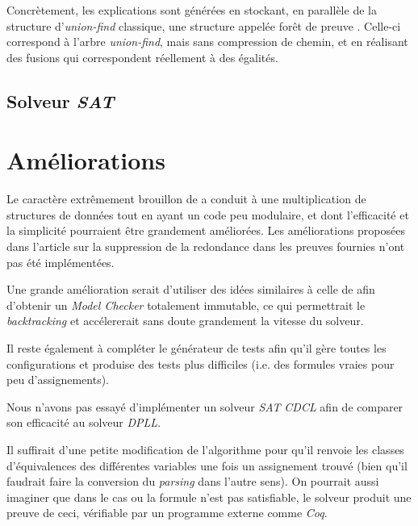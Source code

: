 \documentclass[a4paper, 10pt, french]{article}
\newcommand{\foreign}[1]{\emph{#1}}
\begin{document}
Concrètement, les explications sont générées en stockant, en parallèle de la 
structure d'\foreign{union-find} classique, une structure appelée \og forêt de 
preuve \fg. Celle-ci correspond à l'arbre \foreign{union-find}, mais sans 
compression de chemin, et en réalisant des fusions qui correspondent réellement 
à des égalités.


\subsection {Solveur \foreign{SAT}}


\section{Améliorations}

Le caractère extrêmement brouillon de \cite{ExplainUF} a conduit à une 
multiplication de structures de données tout en ayant un code peu modulaire, et 
dont l'efficacité et la simplicité pourraient être grandement améliorées. Les 
améliorations proposées dans l'article sur la suppression de la redondance dans 
les preuves fournies n'ont pas été implémentées.

Une grande amélioration serait d'utiliser des idées similaires à celle de 
\cite{PersistentUF} afin d'obtenir un \foreign{Model Checker} totalement 
immutable, ce qui permettrait le \foreign{backtracking} et accélererait sans 
doute grandement la vitesse du solveur.

Il reste également à compléter le générateur de tests afin qu'il gère toutes 
les configurations et produise des tests plus difficiles (i.e. des formules 
vraies pour peu d'assignements).

Nous n'avons pas essayé d'implémenter un solveur \foreign{SAT} \foreign{CDCL} 
afin de comparer son efficacité au solveur \foreign{DPLL}.

Il suffirait d'une petite modification de l'algorithme pour qu'il renvoie les 
classes d'équivalences des différentes variables une fois un assignement trouvé 
(bien qu'il faudrait faire la conversion du \foreign{parsing} dans l'autre 
sens). On pourrait aussi imaginer que dans le cas ou la formule n'est pas 
satisfiable, le solveur produit une preuve de ceci, vérifiable par un programme 
externe comme \foreign{Coq}.




\end{document}
